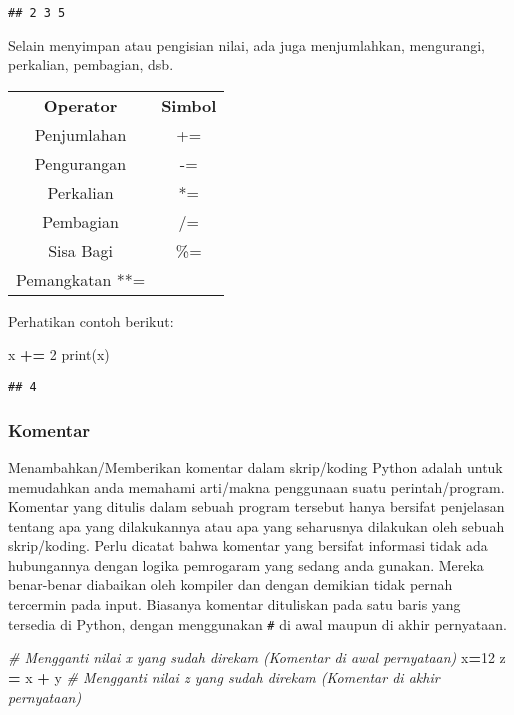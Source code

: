 \documentclass[
]{docs}
\newenvironment{Shaded}{\begin{snugshade}}{\end{snugshade}}
\newcommand{\BuiltInTok}[1]{#1}
\newcommand{\CommentTok}[1]{\textcolor[rgb]{0.56,0.35,0.01}{\textit{#1}}}
\newcommand{\DecValTok}[1]{\textcolor[rgb]{0.00,0.00,0.81}{#1}}
\newcommand{\NormalTok}[1]{#1}
\newcommand{\OperatorTok}[1]{\textcolor[rgb]{0.81,0.36,0.00}{\textbf{#1}}}
\begin{document}
\begin{verbatim}
## 2 3 5
\end{verbatim}

Selain menyimpan atau pengisian nilai, ada juga menjumlahkan, mengurangi, perkalian, pembagian, dsb.

\begin{longtable}[]{@{}cc@{}}
\toprule()
\endhead
\textbf{Operator} & \textbf{Simbol} \\
Penjumlahan & += \\
Pengurangan & -= \\
Perkalian & *= \\
Pembagian & /= \\
Sisa Bagi & \%= \\
Pemangkatan **= & \\
\bottomrule()
\end{longtable}

Perhatikan contoh berikut:

\begin{Shaded}
\begin{Highlighting}[]
\NormalTok{x }\OperatorTok{+=} \DecValTok{2}
\BuiltInTok{print}\NormalTok{(x)}
\end{Highlighting}
\end{Shaded}

\begin{verbatim}
## 4
\end{verbatim}

\hypertarget{komentar}{%
\subsubsection{Komentar}\label{komentar}}

Menambahkan/Memberikan komentar dalam skrip/koding Python adalah untuk memudahkan anda memahami arti/makna penggunaan suatu perintah/program. Komentar yang ditulis dalam sebuah program tersebut hanya bersifat penjelasan tentang apa yang dilakukannya atau apa yang seharusnya dilakukan oleh sebuah skrip/koding. Perlu dicatat bahwa komentar yang bersifat informasi tidak ada hubungannya dengan logika pemrogaram yang sedang anda gunakan. Mereka benar-benar diabaikan oleh kompiler dan dengan demikian tidak pernah tercermin pada input. Biasanya komentar dituliskan pada satu baris yang tersedia di Python, dengan menggunakan \texttt{\#} di awal maupun di akhir pernyataan.

\begin{Shaded}
\begin{Highlighting}[]
\CommentTok{\# Mengganti nilai x yang sudah direkam (Komentar di awal pernyataan) }
\NormalTok{x}\OperatorTok{=}\DecValTok{12} 
\NormalTok{z }\OperatorTok{=}\NormalTok{ x }\OperatorTok{+}\NormalTok{ y   }\CommentTok{\# Mengganti nilai z yang sudah direkam (Komentar di akhir pernyataan) }
\end{Highlighting}
\end{Shaded}
\end{document}
